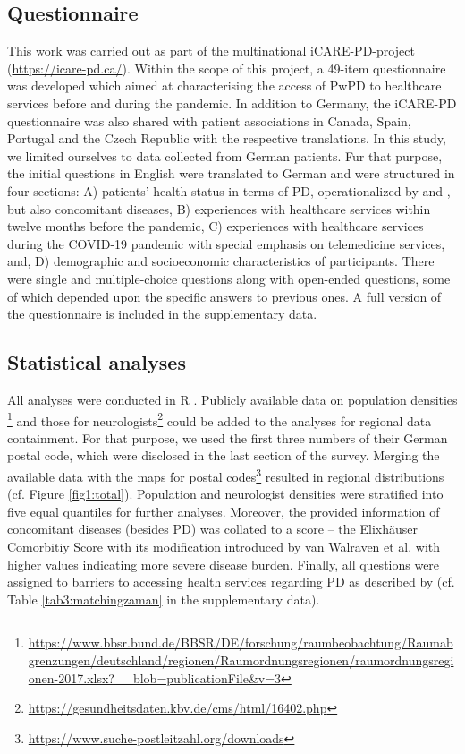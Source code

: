 \documentclass[a4paper,oneside,11pt,english]{scrartcl}
\begin{document}
\subsection*{Questionnaire}
This work was carried out as part of the multinational iCARE-\textsc{PD}-project (\url{https://icare-pd.ca/}). Within the scope of this project, a 49-item questionnaire was developed which aimed at characterising the access of Pw\textsc{PD} to healthcare services before and during the pandemic. In addition to Germany, the iCARE-\textsc{PD} questionnaire was also shared with patient associations in Canada, Spain, Portugal and the Czech Republic with the respective translations. In this study, we limited ourselves to data collected from German patients. Fur that purpose, the initial questions in English were translated to German and were structured in four sections: A) patients' health status in terms of \textsc{PD}, operationalized by \cite{hoenn1967parkinsonism} and \cite{jenkinson1997pdq}, but also  concomitant diseases, B) experiences with healthcare services within twelve months before the pandemic, C) experiences with healthcare services during the \textsc{COVID}-19 pandemic with special emphasis on telemedicine services, and, D) demographic and socioeconomic characteristics of participants. There were single and multiple-choice questions along with open-ended questions, some of which depended upon the specific answers to previous ones. A full version of the questionnaire is included in the supplementary data. 

\subsection*{Statistical analyses}
All analyses were conducted in R \cite{rcore}. Publicly available data on population densities \footnote{\url{https://www.bbsr.bund.de/BBSR/DE/forschung/raumbeobachtung/Raumabgrenzungen/deutschland/regionen/Raumordnungsregionen/raumordnungsregionen-2017.xlsx?\_\_blob=publicationFile\&v=3}} and those for neurologists\footnote{\url{https://gesundheitsdaten.kbv.de/cms/html/16402.php}} could be added to the analyses for regional data containment. For that purpose, we used the first three numbers of their German postal code, which were disclosed in the last section of the survey. Merging the available data with the maps for postal codes\footnote{\url{https://www.suche-postleitzahl.org/downloads}} resulted in regional distributions (cf. Figure \ref{fig1:total}). Population and neurologist densities were stratified into five equal quantiles for further analyses. Moreover, the provided information of concomitant diseases (besides \textsc{PD}) was collated to a score -- the Elixhäuser Comorbitiy Score with its modification introduced by van Walraven et al. \cite{van2009modification} with higher values indicating more severe disease burden. Finally, all questions were assigned to barriers to accessing health services regarding \textsc{PD} as described by \cite{zaman2021barriers} (cf. Table \ref{tab3:matchingzaman} in the supplementary data).
\end{document}
